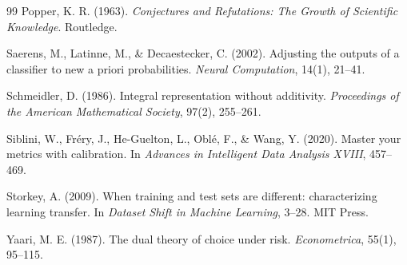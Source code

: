 \documentclass[11pt]{article}
\theoremstyle{remark}
\begin{document}
\begin{thebibliography}{99}
Popper, K. R. (1963).
\emph{Conjectures and Refutations: The Growth of Scientific Knowledge}.
Routledge.

Saerens, M., Latinne, M., \& Decaestecker, C. (2002).
Adjusting the outputs of a classifier to new a priori probabilities.
\emph{Neural Computation}, 14(1), 21--41.

Schmeidler, D. (1986).
Integral representation without additivity.
\emph{Proceedings of the American Mathematical Society}, 97(2), 255--261.

Siblini, W., Fr\'ery, J., He-Guelton, L., Obl\'e, F., \& Wang, Y. (2020).
Master your metrics with calibration.
In \emph{Advances in Intelligent Data Analysis XVIII}, 457--469.

Storkey, A. (2009).
When training and test sets are different: characterizing learning transfer.
In \emph{Dataset Shift in Machine Learning}, 3--28. MIT Press.

Yaari, M. E. (1987).
The dual theory of choice under risk.
\emph{Econometrica}, 55(1), 95--115.

\end{thebibliography}
\end{document}
